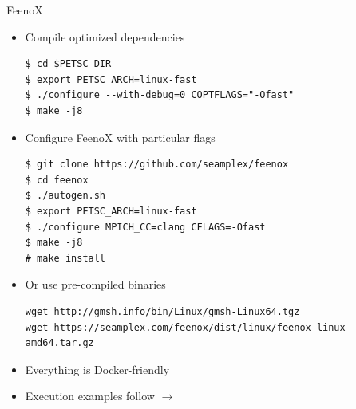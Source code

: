 \documentclass[
  ignorenonframetext,
  aspectratio=169,
]{beamer}
\begin{document}
\begin{frame}[fragile]{}
\begin{columns}[T]
\pause

\begin{column}{0.5\textwidth}
\begin{exampleblock}{FeenoX}
\protect\hypertarget{feenox-4}{}
\begin{itemize}
\item
  Compile optimized dependencies

\begin{lstlisting}[style=terminal]
$ cd $PETSC_DIR
$ export PETSC_ARCH=linux-fast
$ ./configure --with-debug=0 COPTFLAGS="-Ofast"
$ make -j8
\end{lstlisting}
\item
  Configure FeenoX with particular flags

\begin{lstlisting}[style=terminal]
$ git clone https://github.com/seamplex/feenox
$ cd feenox
$ ./autogen.sh
$ export PETSC_ARCH=linux-fast
$ ./configure MPICH_CC=clang CFLAGS=-Ofast
$ make -j8
# make install
\end{lstlisting}
\item
  Or use pre-compiled binaries

\begin{lstlisting}[style=terminal]
wget http://gmsh.info/bin/Linux/gmsh-Linux64.tgz
wget https://seamplex.com/feenox/dist/linux/feenox-linux-amd64.tar.gz
\end{lstlisting}
\item
  Everything is Docker-friendly
\item
  Execution examples follow \(\rightarrow\)
\end{itemize}
\end{exampleblock}
\end{column}
\end{columns}
\end{frame}
\end{document}

